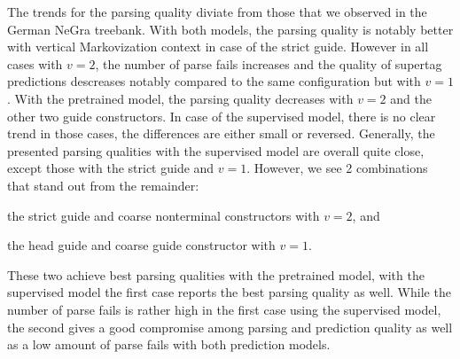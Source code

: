 \documentclass[../../document.tex]{subfiles}
\begin{document}
    The trends for the parsing quality diviate from those that we observed in the German NeGra treebank.
    With both models, the parsing quality is notably better with vertical Markovization context in case of the strict guide.
    However in all cases with $v=2$, the number of parse fails increases and the quality of supertag predictions descreases notably compared to the same configuration but with $v=1$.
    With the pretrained model, the parsing quality decreases with $v=2$ and the other two guide constructors.
    In case of the supervised model, there is no clear trend in those cases, the differences are either small or reversed.
    Generally, the presented parsing qualities with the supervised model are overall quite close, except those with the strict guide and $v=1$.
    However, we see 2 combinations that stand out from the remainder:
    \begin{compactitem}
        \item the strict guide and coarse nonterminal constructors with $v=2$, and
        \item the head guide and coarse guide constructor with $v=1$.
    \end{compactitem}
    These two achieve best parsing qualities with the pretrained model, with the supervised model the first case reports the best parsing quality as well.
    While the number of parse fails is rather high in the first case using the supervised model, the second gives a good compromise among parsing and prediction quality as well as a low amount of parse fails with both prediction models.
\end{document}
